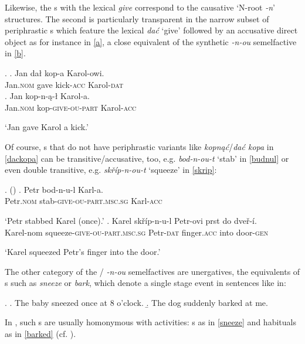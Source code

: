 \noindent
Likewise, the  s with the lexical \textit{give} correspond to the causative `N-root \textit{-n}' structures. The second is particularly transparent in the narrow subset of  periphrastic s which feature the lexical  \textit{da\'c} `give' followed by an accusative direct object as for instance in \ref{a}, a close equivalent of the synthetic \textit{-n-ou} semelfactive in \ref{b}.


\ex. \label{dackopa}
\ag. Jan da\l {} kop-a Karol-owi.\label{a}\\
Jan.\textsc{nom} gave  kick-\textsc{acc} Karol-\textsc{dat}\\
\bg. Jan kop-n-\k{a}-\l {} Karol-a.\label{b}\\
Jan.\textsc{nom} kop-\textsc{give-ou-part} Karol-\textsc{acc}\\
\strut `Jan gave Karol a kick.'\label{Karol}

Of course, s that do not have periphrastic variants like \textit{kopn\k{a}\'c}/\textit{da\'c kopa} in \ref{dackopa} can be transitive/accusative, too, e.g. \textit{bod-n-ou-t} `stab' in \ref{budnul} or even  double transitive, e.g. \textit{sk\v{r}\'ip-n-ou-t} `squeeze' in \ref{skrip}:

\ex.  (\citet[ex. 82]{NU})
\ag.
Petr bod-n-u-l Karl-a. \\
Petr\textsc{.nom} stab-\textsc{give}-\textsc{ou}-\textsc{part.msc.sg} Karl-\textsc{acc}\\
\strut `Petr stabbed Karel (once).'\label{budnul}
\bg. 
Karel sk\v r\'ip-n-u-l Petr-ovi prst do dve\v{r}-\'i. \\
Karel-{\sc nom} squeeze-\textsc{give}-\textsc{ou}-\textsc{part.msc.sg} Petr-\textsc{dat} finger.\textsc{acc} into door-\textsc{gen} \\ 
\strut `Karel squeezed Petr's finger into the door.'\label{skrip}
 
\noindent The other category of the / \textit{-n-ou} semelfactives are unergatives, the equivalents of  s such as \textit{sneeze} or \textit{bark}, which denote a single stage event in sentences like in:

\ex. 
\a. The baby sneezed once at 8 o'clock.  
\b. The dog suddenly barked at me.

In , such s are usually homonymous with activities: s as in \ref{sneeze} and habituals as in \ref{barked} (cf. \citealt{Carlson2012}).

